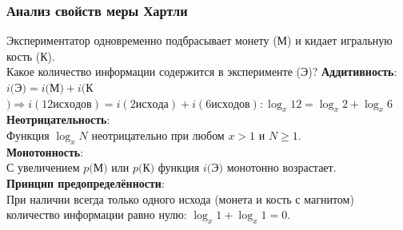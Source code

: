 \documentclass[10pt]{beamer}
\begin{document}
	
  
	\begin{frame}
		 \frametitle {{\color{blue}А}нализ свойств меры Хартли}
		Экспериментатор одновременно подбрасывает монету (М) и кидает игральную кость (К).\\
		Какое количество информации содержится в эксперименте (Э)?
		\vskip 0.5cm
		\textbf{Аддитивность}:\\
		\quad $i($Э$) = i($М$) + i($К$) \Rightarrow i(12 исходов) = i(2 исхода) + i(6 исходов): \log_x 12 = \log_x 2 + \log_x 6$\\
		\vskip 0.3cm
		\textbf{Неотрицательность}:\\
		\quad Функция $\log_x N$ неотрицательно при любом $x > 1$ и $N \geq 1$.\\
		\vskip 0.3cm
		\textbf{Монотонность}:\\
		\quad С увеличением $p($М$)$ или $p($К$)$ функция $i($Э$)$ монотонно возрастает.\\
		\vskip 0.3cm
		\textbf{Принцип предопределённости}:\\
		\quad При наличии всегда только одного исхода (монета и кость с 
		\phantom \quad магнитом) количество  информации равно нулю: $\log_x 1 + \log_x 1 = 0$.\\
    	\end{frame}
\end{document}
